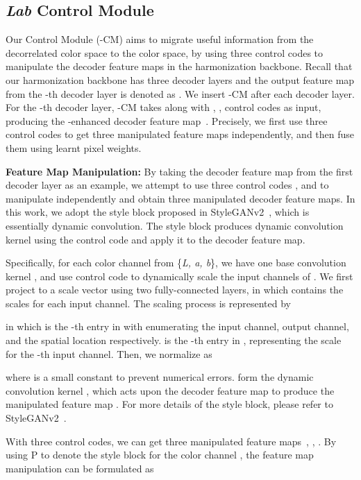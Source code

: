 \documentclass[sigconf]{acmart}
\begin{document}
\subsection{\textit{Lab} Control Module}\label{Color transfer Module}
Our  Control Module (-CM) aims to migrate useful information from the decorrelated  color space to the  color space, by using three control codes to manipulate the decoder feature maps in the harmonization backbone. 
Recall that our harmonization backbone has three decoder layers and the output feature map from the -th decoder layer is denoted as . We insert -CM after each decoder layer. 
For the -th decoder layer, -CM takes  along with , ,  control codes as input, producing the -enhanced decoder feature map~. Precisely, we first use three control codes to get three manipulated feature maps independently, and then fuse them using learnt pixel weights.  

\noindent\textbf{Feature Map Manipulation: }By taking the decoder feature map  from the first decoder layer as an example, we attempt to use three control codes , and  to manipulate  independently and obtain three manipulated decoder feature maps. 
In this work, we adopt the style block proposed in StyleGANv2~\cite{styleganv2}, which is essentially dynamic convolution. The style block produces dynamic convolution kernel using the control code and apply it to the decoder feature map. 

Specifically, for each color channel  from \{\textit{L, a, b}\}, we have one  base convolution kernel , and use control code  to dynamically scale the input channels of . We first project  to a scale vector  using two fully-connected layers, in which  contains the scales for each input channel. The scaling process is represented by

in which  is the -th entry in  with  enumerating the input channel, output channel, and the spatial location respectively.  is the -th entry in , representing the scale for the -th input channel. Then, we normalize  as

where  is a small constant to prevent numerical errors.  form the dynamic convolution kernel , which acts upon the decoder feature map  to produce the manipulated feature map . For more details of the style block, please refer to StyleGANv2~\cite{styleganv2}.

With three control codes, we can get three manipulated feature maps~, , . By using  P to denote the style block for the color channel , the feature map manipulation can be formulated as
\end{document}
